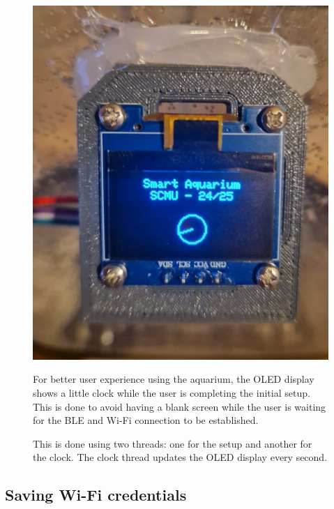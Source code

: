 \documentclass[11pt,a4paper]{article}
\begin{document}
\begin{figure}[h!]
    \centering
    \begin{minipage}{0.25\textwidth}
        \includegraphics[width=\linewidth]{Images/clock.jpeg}
    \end{minipage}%
    \hfill
    \begin{minipage}{0.55\textwidth}
        \small
        For better user experience using the aquarium, the OLED display shows a little clock while the user is completing the initial setup. This is done to avoid having a blank screen while the user is waiting for the BLE and Wi-Fi connection to be established.

        This is done using two threads: one for the setup and another for the clock. The clock thread updates the OLED display every second.
    \end{minipage}
\end{figure}

\subsection{Saving Wi-Fi credentials}
\end{document}
